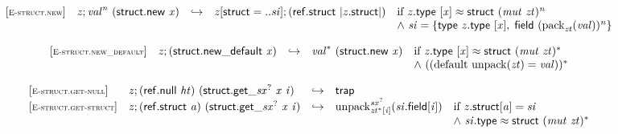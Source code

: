 \vspace{1ex}

$$
\begin{array}{@{}l@{}lcl@{}l@{}}
{[\textsc{\scriptsize E{-}struct.new}]} \quad & {\mathit{z}} ; {{\mathit{val}}^{{\mathit{n}}}}~(\mathsf{struct.new}~{\mathit{x}}) &\hookrightarrow& {\mathit{z}}{}[\mathsf{struct} = ..{\mathit{si}}] ; (\mathsf{ref.struct}~{|{\mathit{z}}.\mathsf{struct}|}) &\quad
  \mbox{if}~{\mathit{z}}.\mathsf{type}~{}[{\mathit{x}}] \approx \mathsf{struct}~{({\mathit{mut}}~{\mathit{zt}})^{{\mathit{n}}}} \\
 &&&&\quad {\land}~{\mathit{si}} = \{ \begin{array}[t]{@{}l@{}}
\mathsf{type}~{\mathit{z}}.\mathsf{type}~{}[{\mathit{x}}],\; \mathsf{field}~{({{\mathrm{pack}}}_{{\mathit{zt}}}({\mathit{val}}))^{{\mathit{n}}}} \}\end{array} \\
\end{array}
$$

$$
\begin{array}{@{}l@{}lcl@{}l@{}}
{[\textsc{\scriptsize E{-}struct.new\_default}]} \quad & {\mathit{z}} ; (\mathsf{struct.new\_default}~{\mathit{x}}) &\hookrightarrow& {{\mathit{val}}^\ast}~(\mathsf{struct.new}~{\mathit{x}}) &\quad
  \mbox{if}~{\mathit{z}}.\mathsf{type}~{}[{\mathit{x}}] \approx \mathsf{struct}~{({\mathit{mut}}~{\mathit{zt}})^\ast} \\
 &&&&\quad {\land}~(({\mathrm{default}}~{\mathrm{unpack}}({\mathit{zt}}) = {\mathit{val}}))^\ast \\
\end{array}
$$

\vspace{1ex}

$$
\begin{array}{@{}l@{}lcl@{}l@{}}
{[\textsc{\scriptsize E{-}struct.get{-}null}]} \quad & {\mathit{z}} ; (\mathsf{ref.null}~{\mathit{ht}})~({{\mathsf{struct.get}}{\mathsf{\_}}}{{{\mathit{sx}}^?}}~{\mathit{x}}~{\mathit{i}}) &\hookrightarrow& \mathsf{trap} &  \\
{[\textsc{\scriptsize E{-}struct.get{-}struct}]} \quad & {\mathit{z}} ; (\mathsf{ref.struct}~{\mathit{a}})~({{\mathsf{struct.get}}{\mathsf{\_}}}{{{\mathit{sx}}^?}}~{\mathit{x}}~{\mathit{i}}) &\hookrightarrow& {{{{\mathrm{unpack}}}_{{{\mathit{zt}}^\ast}{}[{\mathit{i}}]}^{{{\mathit{sx}}^?}}}}{({\mathit{si}}.\mathsf{field}{}[{\mathit{i}}])} &\quad
  \mbox{if}~{\mathit{z}}.\mathsf{struct}{}[{\mathit{a}}] = {\mathit{si}} \\
 &&&&\quad {\land}~{\mathit{si}}.\mathsf{type} \approx \mathsf{struct}~{({\mathit{mut}}~{\mathit{zt}})^\ast} \\
\end{array}
$$

